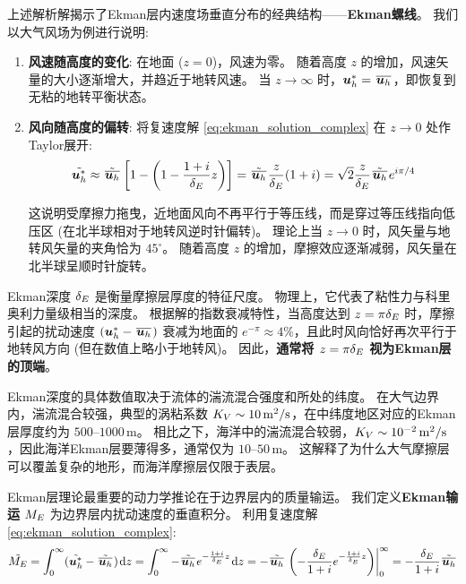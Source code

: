 上述解析解揭示了Ekman层内速度场垂直分布的经典结构——\textbf{Ekman螺线}。
我们以大气风场为例进行说明:
\begin{enumerate}
    \item \textbf{风速随高度的变化}:
        在地面 ($z=0$)，风速为零。
        随着高度 $z$ 的增加，风速矢量的大小逐渐增大，并趋近于地转风速。
        当 $z \to \infty$ 时，$\bm{u}_h^* = \mkern2mu \overline{\bm{u}_h} \mkern2mu$，即恢复到无粘的地转平衡状态。

    \item \textbf{风向随高度的偏转}:
        将复速度解 \eqref{eq:ekman_solution_complex} 在 $z \to 0$ 处作Taylor展开:
        \begin{equation*}
            \tilde{\bm{u}_h^*} \approx \tilde{\mkern2mu \overline{\bm{u}_h} \mkern2mu} \left[1 - \left(1 - \frac{1+i}{\delta_E} z \right)\right] = \tilde{\mkern2mu \overline{\bm{u}_h} \mkern2mu} \frac{z}{\delta_E} (1+i) = \sqrt{2} \frac{z}{\delta_E} \tilde{\mkern2mu \overline{\bm{u}_h} \mkern2mu} e^{i \pi/4}
        \end{equation*}

        这说明受摩擦力拖曳，近地面风向不再平行于等压线，而是穿过等压线指向低压区 (在北半球相对于地转风逆时针偏转)。
        理论上当 $z \to 0$ 时，风矢量与地转风矢量的夹角恰为 $45^\circ$。
        随着高度 $z$ 的增加，摩擦效应逐渐减弱，风矢量在北半球呈顺时针旋转。
\end{enumerate}

Ekman深度 $\delta_E$ 是衡量摩擦层厚度的特征尺度。
物理上，它代表了粘性力与科里奥利力量级相当的深度。
根据解的指数衰减特性，当高度达到 $z = \pi \delta_E$ 时，摩擦引起的扰动速度 $(\bm{u}_h^* - \mkern2mu \overline{\bm{u}_h} \mkern2mu)$ 衰减为地面的 $e^{-\pi} \approx 4\%$，且此时风向恰好再次平行于地转风方向 (但在数值上略小于地转风)。
因此，\textbf{通常将 $z = \pi \delta_E$ 视为Ekman层的顶端}。

Ekman深度的具体数值取决于流体的湍流混合强度和所处的纬度。
在大气边界内，湍流混合较强，典型的涡粘系数 $K_V \sim 10\,\mathrm{m^2/s}$，在中纬度地区对应的Ekman层厚度约为 $500 \text{--} 1000\,\mathrm{m}$。
相比之下，海洋中的湍流混合较弱，$K_V \sim 10^{-2}\,\mathrm{m^2/s}$，因此海洋Ekman层要薄得多，通常仅为 $10 \text{--} 50\,\mathrm{m}$。
这解释了为什么大气摩擦层可以覆盖复杂的地形，而海洋摩擦层仅限于表层。

Ekman层理论最重要的动力学推论在于边界层内的质量输运。
我们定义\textbf{Ekman输运} $M_E$ 为边界层内扰动速度的垂直积分。
利用复速度解 \eqref{eq:ekman_solution_complex}:
\begin{equation*}
    \tilde{M_E} = \int_0^\infty (\tilde{\bm{u}_h^*} - \tilde{\mkern2mu \overline{\bm{u}_h} \mkern2mu}) \mkern2mu \mathrm{d} z = \int_0^\infty -\tilde{\mkern2mu \overline{\bm{u}_h} \mkern2mu} e^{-\frac{1+i}{\delta_E} z} \mkern2mu \mathrm{d} z = -\tilde{\mkern2mu \overline{\bm{u}_h} \mkern2mu} \left.\left(-\frac{\delta_E}{1+i} e^{-\frac{1+i}{\delta_E} z}\right)\right|_0^\infty = -\frac{\delta_E}{1+i} \tilde{\mkern2mu \overline{\bm{u}_h} \mkern2mu}
\end{equation*}

